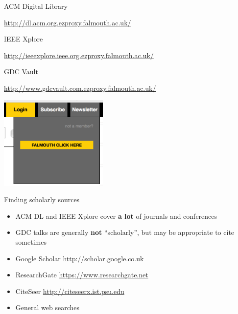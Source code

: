 \begin{frame}{ACM Digital Library}
	\begin{center}
		\small\url{http://dl.acm.org.ezproxy.falmouth.ac.uk/}
	\end{center}
\end{frame}

\begin{frame}{IEEE Xplore}
	\begin{center}
		\small\url{http://ieeexplore.ieee.org.ezproxy.falmouth.ac.uk/}
	\end{center}
\end{frame}

\begin{frame}{GDC Vault}
	\begin{center}
		\small\url{http://www.gdcvault.com.ezproxy.falmouth.ac.uk/}
		
		\vspace{2ex}
		
		\includegraphics[width=0.4\textwidth]{gdc_login}
	\end{center}
\end{frame}

\begin{frame}{Finding scholarly sources}
	\begin{itemize}
		\pause\item ACM DL and IEEE Xplore cover \textbf{a lot} of journals and conferences
		\pause\item GDC talks are generally \textbf{not} ``scholarly'', but may be appropriate to cite sometimes
		\pause\item Google Scholar \url{http://scholar.google.co.uk}
		\pause\item ResearchGate \url{https://www.researchgate.net}
		\pause\item CiteSeer \url{http://citeseerx.ist.psu.edu}
		\pause\item General web searches
	\end{itemize}
\end{frame}

